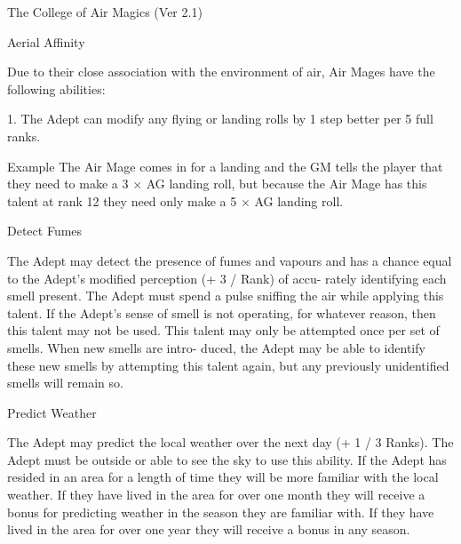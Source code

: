 \begin{Chapter}{The College of Air Magics (Ver 2.1)}
\begin{talent}[T-1]{Aerial Affinity }
\begin{effects}
 Due  to  their  close  association  with  the 
environment  of  air,  Air  Mages  have  the  following 
abilities: 

1.  The  Adept  can  modify  any  flying  or  landing 
rolls by 1 step better per 5 full ranks. 

Example 
The  Air  Mage  comes  in  for  a  landing  and 
the  GM  tells  the  player  that  they  need  to  make  a  3  ×  AG 
landing  roll,  but  because  the  Air  Mage  has  this  talent  at 
rank 12 they need only make a 5 × AG landing roll. 

\end{effects}
\end{talent}

\begin{talent}[T-2]{Detect Fumes }

\begin{effects}
 The  Adept  may  detect  the  presence  of 
fumes  and  vapours  and  has  a  chance  equal  to  the 
Adept’s modified perception (+ 3 / Rank) of accu-
rately  identifying  each  smell  present.  The  Adept 
must  spend a pulse  sniffing the  air  while  applying 
this  talent.  If  the  Adept’s  sense  of  smell  is  not 
operating, for whatever reason, then this talent may 
not  be  used.  This  talent  may  only  be  attempted 
once per set of smells. When new smells are intro-
duced, the Adept may be able to identify these new 
smells  by  attempting  this  talent  again,  but  any 
previously unidentified smells will remain so. 

\end{effects}
\end{talent}

\begin{talent}[T-3]{Predict Weather }

\begin{effects}
 The  Adept  may  predict  the  local  weather 
over the next day (+ 1 / 3 Ranks). The Adept must 
be outside or able to see the sky to use this ability. 
If  the  Adept  has  resided  in an area  for  a  length  of 
time  they  will  be  more  familiar  with  the  local 
weather. If they have lived in the area for over one 
month  they  will  receive  a  bonus  for  predicting 
weather in the season they are familiar with. If they 
have  lived  in  the  area  for  over  one  year  they  will 
receive a bonus in any season. 


\end{effects}
\end{talent}
\end{Chapter}
